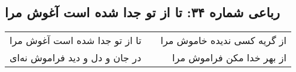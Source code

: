 \begin{center}
\section*{رباعی شماره ۳۴: تا از تو جدا شده است آغوش مرا}
\label{sec:0034}
\begin{longtable}{l p{0.5cm} r}
تا از تو جدا شده است آغوش مرا
&&
از گریه کسی ندیده خاموش مرا
\\
در جان و دل و دید فراموش نه‌ای
&&
از بهر خدا مکن فراموش مرا
\\
\end{longtable}
\end{center}
